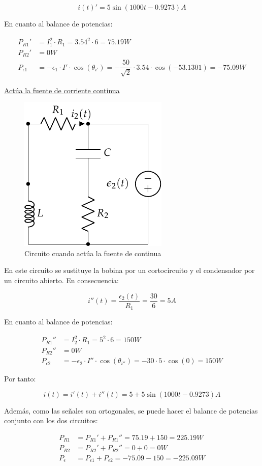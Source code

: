 \begin{example}
\begin{equation*}
  i(t)' = 5\sin(1000t - 0.9273) A
\end{equation*}

En cuanto al balance de potencias:

\begin{align*}
  P_{R1}' &= I_1^2\cdot R_1= 3.54^2\cdot 6= {75.19}{W}\\
  P_{R2}' &= {0} W\\
  P_{\epsilon1} &= -{\epsilon_1} \cdot {I'}\cdot\cos(\theta_{i'}) = -\dfrac{50}{\sqrt{2}}\cdot 3.54\cdot\cos(-53.1301) = -{75.09} W
\end{align*}

\underline{Actúa la fuente de corriente continua}

\begin{figure}[H]
    \centering
    \includegraphics[width=0.25\linewidth]{../figs/superposicion1_DC.pdf}
    \caption{Circuito cuando actúa la fuente de continua}
    \label{fig.superposicion1_DC}
\end{figure}

En este circuito se sustituye la bobina por un cortocircuito y el condensador por un circuito abierto. En consecuencia:

\begin{equation*}
  i''(t) = \dfrac{\epsilon_2(t)}{R_1}=\dfrac{30}{6} = {5}A
\end{equation*}

En cuanto al balance de potencias:

\begin{align*}
  P_{R1}'' &= I_2^2 \cdot R_1=5^2\cdot 6 = {150} W\\
  P_{R2}'' &= {0} W\\
  P_{\epsilon2} &= -\epsilon_2 \cdot I''\cdot\cos(\theta_{i''}) = -30\cdot 5\cdot\cos(0)  = {150} W
\end{align*}

Por tanto:

\begin{equation*}
  i(t) = i'(t) + i''(t) = 5 + 5\sin(1000t - 0.9273) A
\end{equation*}

Además, como las señales son ortogonales, se puede hacer el balance de potencias conjunto con los dos circuitos:

\begin{align*}
  P_{R1} &= P_{R1}' + P_{R1}'' = 75.19+150={225.19} W\\
  P_{R2} &= P_{R2}' + P_{R2}'' = 0+0 = {0} W\\
  P_{\epsilon} &= P_{\epsilon1} + P_{\epsilon2} = -75.09-150=-{225.09} W\\
\end{align*}
\end{example}

	

